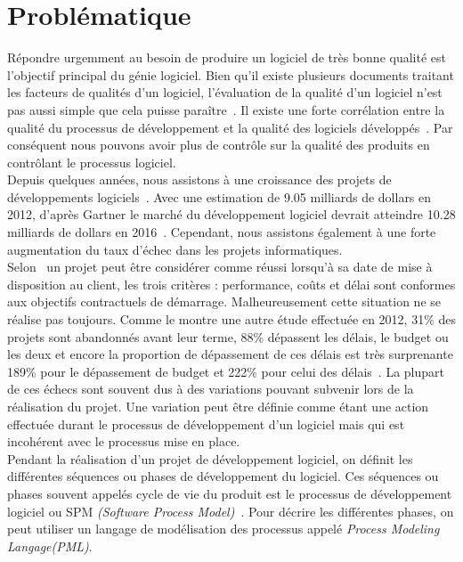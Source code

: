 \section{Problématique}
Répondre urgemment au besoin de produire un logiciel de très bonne qualité est l'objectif principal du génie logiciel. Bien qu'il existe plusieurs documents traitant les facteurs de qualités d'un logiciel, l'évaluation de la qualité d'un logiciel n'est pas aussi simple que cela puisse paraître~\citep{wikQual}. Il existe une forte corrélation entre la qualité du processus de développement et la qualité des logiciels développés~\cite{wikar}. Par conséquent nous pouvons avoir plus de contrôle sur la qualité des produits en contrôlant le processus logiciel.\\
Depuis quelques années, nous assistons à une croissance des projets de développements logiciels~\cite{jdn}. Avec une estimation de 9.05 milliards  de dollars en 2012, d'après Gartner le marché du développement logiciel devrait atteindre 10.28 milliards de dollars en 2016~\cite{01net}. Cependant, nous assistons également à une forte augmentation du taux d'échec dans  les projets informatiques.\\ 
Selon~\cite{gdpra} un projet peut être considérer comme réussi lorsqu'à sa date de mise à disposition au client, les trois critères : performance, coûts et délai sont conformes aux objectifs contractuels de démarrage. Malheureusement cette situation ne se réalise pas toujours. Comme le montre une autre étude effectuée en 2012, 31\% des projets sont abandonnés avant leur terme, 88\% dépassent les délais, le budget ou les deux et encore la proportion de dépassement de ces délais est très surprenante 189\% pour le dépassement de budget et 222\% pour celui des délais~\cite{pcp}. La plupart de ces échecs sont souvent dus à des variations pouvant subvenir lors de la réalisation du projet. Une variation peut être définie comme étant une  action effectuée durant le processus de développement d'un logiciel mais qui est incohérent avec le processus mise en place.\\
Pendant la réalisation d'un projet de développement logiciel, on définit les différentes séquences ou phases de développement du logiciel. Ces séquences ou phases souvent appelés cycle de vie du produit est le processus de développement logiciel ou SPM \textit{(Software Process Model)}~\cite{tse}. Pour décrire les différentes phases, on peut utiliser un langage de modélisation des processus appelé \textit{Process Modeling Langage(PML)}.\\
